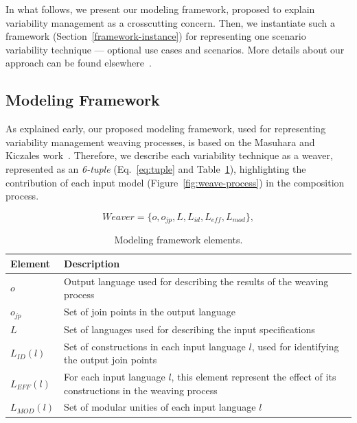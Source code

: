 \documentclass[times, 11pt,twocolumn]{article}
\begin{document}
In what follows, we present our modeling framework, proposed to explain
variability management as a crosscutting concern. Then, we instantiate such a
framework (Section~\ref{framework-instance}) for representing one scenario variability
technique --- optional use cases and scenarios. More details about our approach can be found
elsewhere~\cite{}.

\subsection{Modeling Framework}\label{sub:framework}

As explained early, our proposed modeling framework, used for representing 
variability management weaving processes, is based on the Masuhara and Kiczales
work~\cite{Masuhara:2003aa}. Therefore, we describe each variability technique
as a weaver, represented as an \emph{6-tuple} (Eq.~\ref{eq:tuple} and
Table~\ref{tab:tup-01}), highlighting the contribution of each input model
(Figure~\ref{fig:weave-process}) in the composition process.

\begin{equation}
Weaver = \{o, o_{jp}, L, L_{id}, L_{eff}, L_{mod}\}, 
\label{eq:tuple}
\end{equation}

\begin{table}[bth]
\begin{center}
\caption{Modeling framework elements.} \label{tab:tup-01}
\begin{tabular}{|p{0.6in}|p{2.4in}|}
  \hline
  {\bf Element} & {\bf Description} \\ 
   \hline
  $o$          & Output language used for describing the results of the weaving process \\ \hline
  $o_{jp}$     & Set of join points in the output language \\ \hline
  $L$          & Set of languages used for describing the input specifications \\ \hline
  $L_{ID}(l)$  & Set of constructions in each input language $l$, used for identifying the output join points \\ \hline 
  $L_{EFF}(l)$ & For each input language $l$, this element represent the effect of its constructions in the weaving process \\ \hline
  $L_{MOD}(l)$ & Set of modular unities of each input language $l$\\ \hline
  \hline
\end{tabular}
\end{center}
\end{table}
\end{document}
